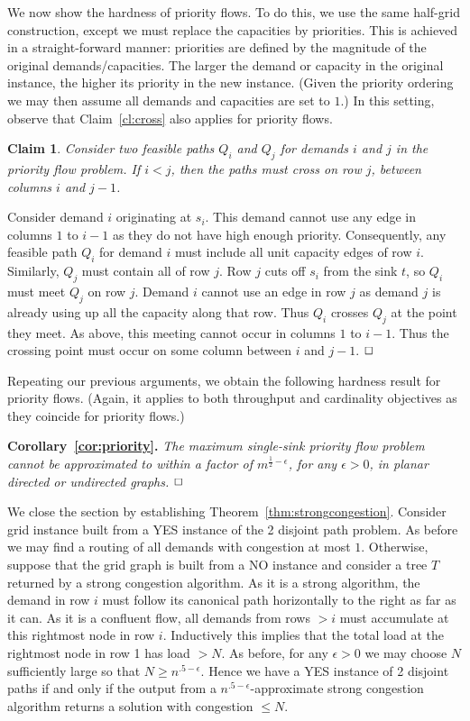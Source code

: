 \documentclass[12pt]{article}
\newtheorem{claim}{Claim}[section]
\newcommand{\qed}{$\hfill{\Box}$}
\begin{document}
We now show the hardness of priority flows. To do this,
we use the same half-grid construction, except we must replace the
capacities by priorities. This is achieved in a straight-forward manner:
priorities are defined by the magnitude of the original demands/capacities.
The larger the demand or capacity in the original instance, the higher its priority in the
new instance. (Given the priority ordering we may then assume all demands and
capacities are set to $1$.)
In this setting, observe that Claim~\ref{cl:cross} also applies for priority flows.
\begin{claim}
Consider  two feasible paths $Q_i$ and $Q_j$ for demands $i$ and $j$ in the priority flow problem.
If $i<j$, then the paths must cross on row $j$, between columns $i$ and $j-1$.
\end{claim}
Consider demand $i$ originating at $s_i$. This demand cannot
use any edge in columns $1$ to $i-1$ as they do not have high enough priority.
Consequently, any feasible path $Q_i$ for demand $i$ must include all unit capacity edges  of row $i$.
Similarly, $Q_j$ must contain all of row $j$. Row $j$ cuts off $s_i$ from the sink $t$, so
$Q_i$ must meet $Q_j$ on row $j$.
Demand $i$ cannot use an edge in row $j$ as demand $j$ is already using up all the capacity along that row.
Thus $Q_i$ crosses $Q_j$ at the point they meet. As above, this meeting cannot occur
in columns $1$ to $i-1$. Thus the crossing point must occur on some column between $i$ and $j-1$.
\qed

Repeating our previous arguments, we obtain the following hardness result for priority flows.
(Again, it applies to both throughput and cardinality objectives as they coincide for priority flows.)

{{\noindent\bf Corollary~\ref{cor:priority}.} \itshape
The maximum single-sink priority flow problem
cannot be approximated to within a factor of $m^{\frac12-\epsilon}$, for any $\epsilon > 0$, in planar
directed or undirected graphs. \qed
}

\vspace*{.2cm}
We close the section by establishing   Theorem~\ref{thm:strongcongestion}. Consider  grid instance  built from
 a YES instance of the 2 disjoint path problem. As before we may find a routing of all demands with  congestion at most $1$.
Otherwise, suppose that the grid graph is built from  a NO instance and consider a tree $T$ returned by a strong congestion algorithm.
As it is a strong algorithm, the demand in row $i$ must follow its canonical path horizontally to the right as far as it can.
As it is a confluent flow, all demands from rows $>i$ must accumulate at this rightmost node in row $i$.
Inductively this implies that the total load at the rightmost node in row 1 has load $>N$.
As before, for any $\epsilon > 0$ we may choose $N$ sufficiently large so that $N \geq n^{.5-\epsilon}$. Hence
we have a YES instance of 2 disjoint paths if and only if the output from a $n^{.5-\epsilon}$-approximate strong congestion algorithm
returns a solution with congestion $\leq N$.
\end{document}
